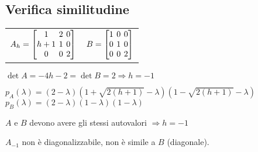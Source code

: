 \subsection{Verifica similitudine}
\begin{tabular}{cc}
	$
	A_h = \left[
		\arraycolsep=2.0pt\def\arraystretch{1.0}
		\begin{array}{@{}ccc@{}}
			1   & 2 & 0 \\
			h+1 & 1 & 0 \\
			0   & 0 & 2 \\
		\end{array}
	\right]
	$ &
	$
	B = \left[
		\arraycolsep=2.0pt\def\arraystretch{1.0}
		\begin{array}{@{}ccc@{}}
			1 & 0 & 0 \\
			0 & 1 & 0 \\
			0 & 0 & 2 \\
		\end{array}
	\right]
	$
\end{tabular}

$\det A = -4h-2 = \det B = 2 \Rightarrow h = -1$

$p_A(\lambda) = (2-\lambda)(1+\sqrt{2(h+1)}-\lambda)(1-\sqrt{2(h+1)}-\lambda)$
$p_B(\lambda) = (2-\lambda)(1-\lambda)(1-\lambda)$

$A$ e $B$ devono avere gli stessi autovalori $\Rightarrow h = -1$

%

$A_{-1}$ non è diagonalizzabile, non è simile a $B$ (diagonale).
